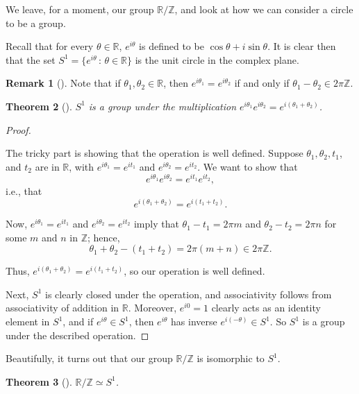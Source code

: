 \documentclass[10pt,openany,oneside]{book}
\theoremstyle{plain}
\newtheorem{theorem}{Theorem}[section]
\theoremstyle{definition}
\theoremstyle{definition}
\newtheorem{remark}[theorem]{Remark}
\theoremstyle{definition}
\theoremstyle{definition}
\numberwithin{equation}{section}
\def\Z{\mathbb{Z}}
\def\R{\mathbb{R}}
\begin{document}
\par
We leave, for a moment, our group \(\R/\Z\), and look at how we can consider a circle to be a group.%
\par
\label{notation-78}
 Recall that for every \(\theta \in \R\), \(e^{i\theta}\) is defined to be \(\cos \theta + i\sin \theta\). It is clear then that the set \(S^1=\{e^{i\theta} \,:\, \theta\in
\R\}\) is the unit circle in the complex plane.%
\begin{remark}[]\label{remark-43}
Note that if \(\theta_1, \theta_2\in \R\), then \(e^{i\theta_1}=e^{i\theta_2}\) if and only if \(\theta_1-\theta_2
\in 2\pi \Z\).%
\end{remark}
\begin{theorem}[{}]\label{theorem-66}
\(S^1\) is a group under the multiplication \(e^{i\theta_1}e^{i\theta_2}=e^{i(\theta_1+\theta_2)}\).%
\end{theorem}
\begin{proof}\hypertarget{proof-51}{}
The tricky part is showing that the operation is well defined. Suppose \(\theta_1, \theta_2, t_1\), and \(t_2\) are in \(\R\), with \(e^{i\theta_1}=e^{it_1}\) and \(e^{i\theta_2}=e^{it_2}\). We want to show that%
\begin{equation*}
e^{i\theta_1}e^{i\theta_2}=e^{it_1}e^{it_2},
\end{equation*}
i.e., that%
\begin{equation*}
e^{i(\theta_1+\theta_2)}=e^{i(t_1+t_2)}.
\end{equation*}
%
\par
Now, \(e^{i\theta_1}=e^{it_1}\) and \(e^{i\theta_2}=e^{it_2}\) imply that \(\theta_1 -t_1 = 2\pi m\) and \(\theta_2-t_2 = 2\pi n\) for some \(m\) and \(n\) in \(\Z\); hence,%
\begin{equation*}
\theta_1+\theta_2-(t_1+t_2)= 2\pi(m+n) \in 2\pi\Z.
\end{equation*}
%
\par
Thus, \(e^{i(\theta_1+\theta_2)}=e^{i(t_1+t_2)}\), so our operation is well defined.%
\par
Next, \(S^1\) is clearly closed under the operation, and associativity follows from associativity of addition in \(\R\). Moreover, \(e^{i0}=1\) clearly acts as an identity element in \(S^1\), and if \(e^{i\theta}\in S^1\), then \(e^{i\theta}\) has inverse \(e^{i(-\theta)} \in S^1\). So \(S^1\) is a group under the described operation.%
\end{proof}
Beautifully, it turns out that our group \(\R/\Z\) is isomorphic to \(S^1\).%
\begin{theorem}[{}]\label{theorem-67}
\(\R/\Z \simeq S^1\).%
\end{theorem}
\end{document}
